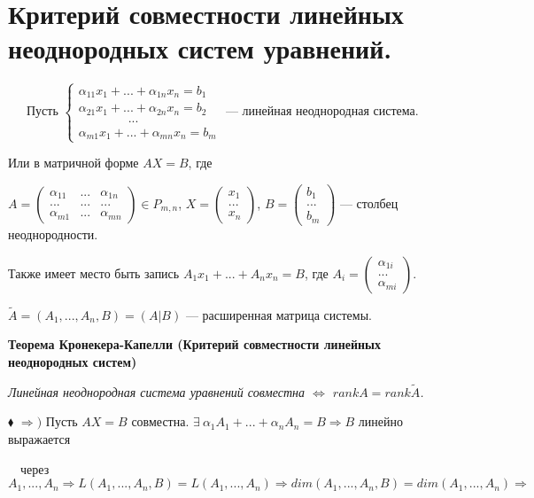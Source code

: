 \documentclass[a4paper, 12pt]{report}
\begin{document}
	\section{Критерий совместности линейных неоднородных систем уравнений.}
	$\quad \; \ $Пусть
	$\begin{cases}
		\alpha_{11}x_1+...+\alpha_{1n}x_n=b_1 \\
		\alpha_{21}x_1+...+\alpha_{2n}x_n=b_2 \\
		\qquad\qquad...\\
		\alpha_{m1}x_1+...+\alpha_{mn}x_n=b_m
	\end{cases}$ --- линейная неоднородная система.
	\par\bigskip
	Или в матричной форме $AX = B$, где
	\par\bigskip
	$A = \begin{pmatrix} \alpha_{11} & ... & \alpha_{1n} \\ ... & ... & ...\\ \alpha_{m1} & ... & \alpha_{mn} \end{pmatrix} \in P_{m,n}$, 
	$X = \begin{pmatrix} x_1 \\ ...\\ x_n \end{pmatrix}$, $B = \begin{pmatrix} b_1 \\ ...\\ b_m \end{pmatrix}$ --- столбец неоднородности.
	\par\bigskip
	Также имеет место быть запись $A_1 x_1 + ... + A_n x_n = B$, где $A_i = \begin{pmatrix} \alpha_{1i} \\ ...\\ \alpha_{mi}\end{pmatrix}$. 
	
	$\tilde{A}=(A_1,...,A_n,B) = (A|B)$ --- расширенная матрица системы.
	\par\bigskip
	\textbf{Теорема Кронекера-Капелли (Критерий совместности линейных неоднородных систем)}
	
	\textit{Линейная неоднородная система уравнений совместна $\Longleftrightarrow$ $rank A = rank\tilde{A}$.}
	\par\bigskip
	
	$\blacklozenge$ $\Rightarrow)$ Пусть $AX = B$ совместна. $\exists\  \alpha_1 A_1 + ... + \alpha_n A_n = B \Rightarrow B$ линейно выражается 
	
	$\quad$через $A_1,...,A_n \Rightarrow L(A_1,...,A_n,B) =L(A_1,...,A_n) \Rightarrow dim(A_1,...,A_n,B) = dim(A_1,...,A_n)\Rightarrow$ 
	
\end{document}
